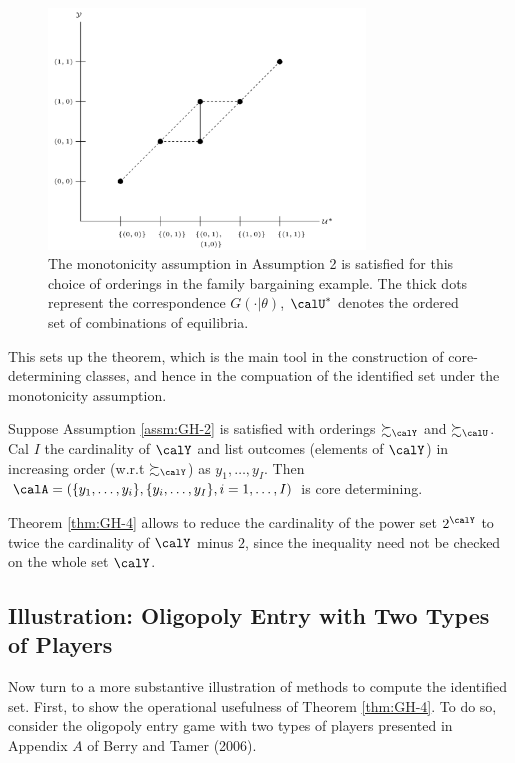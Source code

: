 \begin{figure}[htb!]
	\centering
	\includegraphics[width=0.75\textwidth]{figures/GH-Fig3.png}
	\caption{The monotonicity assumption in Assumption 2 is satisfied for this choice of orderings in the family bargaining example. The thick dots represent the correspondence $G(\cdot | \theta)$, $\calU^*$ denotes the ordered set of combinations of equilibria.}
	\label{fig:GH-Fig3}
\end{figure}
This sets up the theorem, which is the main tool in the construction of core-determining classes, and hence in the compuation of the identified set under the monotonicity assumption.
\begin{theorem}
	\label{thm:GH-4}
	Suppose Assumption \ref{assm:GH-2} is satisfied with orderings $\succsim_\calY$ and $\succsim_\calU$. Cal $I$ the cardinality of $\calY$ and list outcomes (elements of $\calY$) in increasing order (w.r.t $\succsim_\calY$) as $y_1, \dots, y_I$. Then $\calA = (\{y_1, \dots, y_i\},\{y_i,\dots, y_I\}, i = 1,\dots, I)$ is core determining. 
\end{theorem}

Theorem \ref{thm:GH-4} allows to reduce the cardinality of the power set $2^\calY$ to twice the cardinality of $\calY$ minus $2$, since the inequality need not be checked on the whole set $\calY$. 

\subsection{Illustration: Oligopoly Entry with Two Types of Players}

Now turn to a more substantive illustration of methods to compute the identified set. First, to show the operational usefulness of Theorem \ref{thm:GH-4}. To do so, consider the oligopoly entry game with two types of players presented in Appendix $A$ of Berry and Tamer (2006). 

